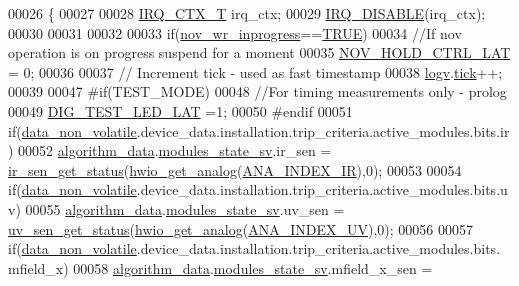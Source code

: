 \begin{DoxyCode}
00026 \{
00027         
00028   \hyperlink{a00033_a6d4f0a7397640f5b011ca9c39d47dc72}{IRQ\_CTX\_T}   irq\_ctx;
00029   \hyperlink{a00033_a357168bbe78739811cdb7b5576714ca6}{IRQ\_DISABLE}(irq\_ctx);  
00030 
00031 
00032 
00033     \textcolor{keywordflow}{if}(\hyperlink{a00029_a56fe014653ebdce270aeac664bf86e65}{nov\_wr\_inprogress}==\hyperlink{a00040_aa8cecfc5c5c054d2875c03e77b7be15d}{TRUE})
00034         \textcolor{comment}{//If nov operation is on progress suspend for a moment}
00035         \hyperlink{a00029_aa03a6ff293decd7159ed1642ccbac971}{NOV\_HOLD\_CTRL\_LAT} = 0;
00036 
00037   \textcolor{comment}{// Increment tick - used as fast timestamp}
00038     \hyperlink{a00021_a2e89c46668b39a17753c238950c9e1ec}{logv}.\hyperlink{a00021_a81f0ce68c2c483fb8df726cc1988d8e8}{tick}++;
00039 
00047 \textcolor{preprocessor}{#if(TEST\_MODE)}
00048     \textcolor{comment}{//For timing measurements only - prolog}
00049     \hyperlink{a00058_a4c044f78fb8b7ee19bfdb5d2b204b50e}{DIG\_TEST\_LED\_LAT} =1;
00050 \textcolor{preprocessor}{#endif}
00051     \textcolor{keywordflow}{if}(\hyperlink{a00060_a76ac5f917f5308dcd83de0d7c94559fb}{data\_non\_volatile}.device\_data.installation.trip\_criteria.active\_modules.bits.ir)
00052          \hyperlink{a00016_a183caa40cd01e79ee309cc9c4a225197}{algorithm\_data}.\hyperlink{a00016_a293140e240bbd54f7601adbc9194148c}{modules\_state\_sv}.ir\_sen = 
      \hyperlink{a00017_a5bba51487aeccd791ff56017124da833}{ir\_sen\_get\_status}(\hyperlink{a00058_a5770775aca185380868838e69ec20215}{hwio\_get\_analog}(\hyperlink{a00058_a1fae4d2e8dd35f504ec4170044da7e73}{ANA\_INDEX\_IR}),0);
00053 
00054     \textcolor{keywordflow}{if}(\hyperlink{a00060_a76ac5f917f5308dcd83de0d7c94559fb}{data\_non\_volatile}.device\_data.installation.trip\_criteria.active\_modules.bits.uv)
00055           \hyperlink{a00016_a183caa40cd01e79ee309cc9c4a225197}{algorithm\_data}.\hyperlink{a00016_a293140e240bbd54f7601adbc9194148c}{modules\_state\_sv}.uv\_sen = 
      \hyperlink{a00020_a354d25047e79397dbe5525178f19cae0}{uv\_sen\_get\_status}(\hyperlink{a00058_a5770775aca185380868838e69ec20215}{hwio\_get\_analog}(\hyperlink{a00058_af523b82e94e382153f1313307c5bd879}{ANA\_INDEX\_UV}),0);
00056 
00057     \textcolor{keywordflow}{if}(\hyperlink{a00060_a76ac5f917f5308dcd83de0d7c94559fb}{data\_non\_volatile}.device\_data.installation.trip\_criteria.active\_modules.bits.
      mfield\_x)
00058           \hyperlink{a00016_a183caa40cd01e79ee309cc9c4a225197}{algorithm\_data}.\hyperlink{a00016_a293140e240bbd54f7601adbc9194148c}{modules\_state\_sv}.mfield\_x\_sen = 

\end{DoxyCode}

